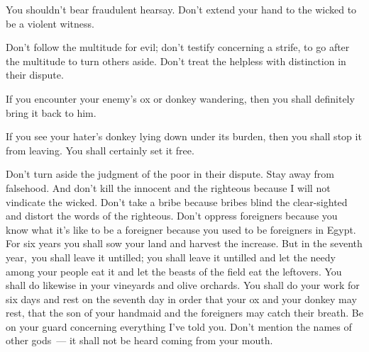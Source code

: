 
\begin{inparaenum}
   You shouldn't bear fraudulent hearsay. Don't extend your hand to the wicked to be a violent witness.%
  
   Don't follow the multitude for evil; don't testify concerning a strife, to go after the multitude to turn others aside.%
   Don't treat the helpless with distinction in their dispute.%
  
   If you encounter your enemy's ox or donkey wandering, then you shall definitely bring it back to him.%
  
   If you see your hater's donkey lying down under its burden, then you shall stop it from leaving. You shall certainly set it free.%
  
   Don't turn aside the judgment of the poor in their dispute.%
   Stay away from falsehood. And don't kill the innocent and the righteous because I will not vindicate the wicked.%
   Don't take a bribe because bribes blind the clear-sighted and distort the words of the righteous.%
   Don't oppress foreigners because you know what it's like to be a foreigner because you used to be foreigners in Egypt.%
   For six years you shall sow your land and harvest the increase.%
   But in the seventh year,\understood\ you shall leave it untilled; you shall leave it untilled and let the needy among your people eat it and let the beasts of the field eat the leftovers. You shall do likewise in your vineyards and olive orchards.%
   You shall do your work for six days and rest on the seventh day in order that your ox and your donkey may rest, that the son of your handmaid and the foreigners may catch their breath.%
   Be on your guard concerning everything I've told you. Don't mention the names of other gods~--- it shall not be heard coming from your mouth.%
  

\end{inparaenum}
